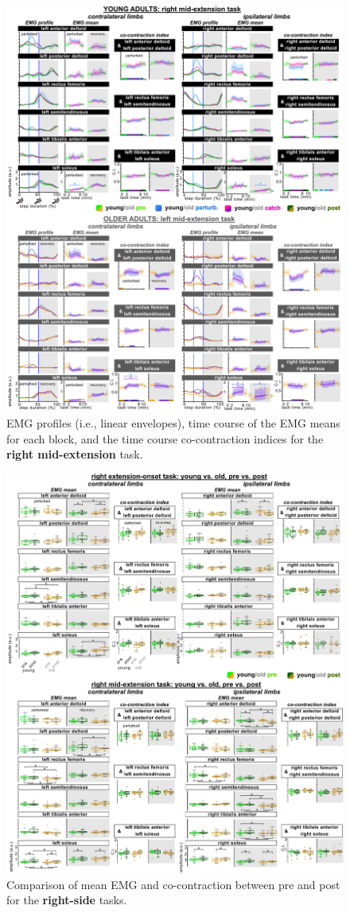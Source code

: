 \documentclass[../thesis_seyed.tex]{subfiles}
\begin{document}
\newpage
\begin{figure}[H]
    \centering
    \includegraphics[scale=.9]{../img/S3_RME-EMG-CoCont.jpg}
    \caption{EMG profiles (i.e., linear envelopes), time course of the EMG means for each block, and the time course co-contraction indices for the \textbf{right mid-extension} task.}
    \label{fig:S3}
\end{figure}
\newpage
\begin{figure}[H]
    \centering
    \includegraphics[scale=.9]{../img/S4_rightside_pre-post-comparison.jpg}
    \caption{Comparison of mean EMG and co-contraction between pre and post for the \textbf{right-side} tasks.}
    \label{fig:S4}
\end{figure}

\end{document}
